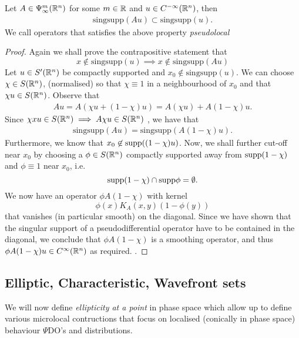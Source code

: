 \documentclass{article}
\begin{document}
\begin{fprop}
    Let $A \in \Psi^m_\infty({\mathbb R}^n)$ for some $m \in {\ensuremath {\mathbb R}}$ and $u \in C^{-\infty}({\mathbb R}^n)$, then 
    \begin{align*}
    \mathrm{sing supp}(A u) \subset \mathrm{sing supp }(u). 
    \end{align*}
    We call operators that satisfies the above property \textit{pseudolocal}
\end{fprop}
\begin{proof}
     Again we shall prove the contrapositive statement that 
    \[
    x \not \in \mathrm{sing supp}(u) \implies x \not \in \mathrm{sing supp}(Au)
    \]
    Let $u \in S'({\mathbb R}^n)$ be compactly supported and $x_0 \not \in \mathrm{sing supp}(u)$.  We can choose $\chi \in S({\mathbb R}^n)$, (normalised) so that $\chi \equiv 1$ in a neighbourhood of $x_0$ and that $\chi u \in S({\mathbb R}^n)$. Observe that 
    \begin{align*}
    Au = A(\chi u + (1 - \chi)u) = A(\chi u) + A(1 - \chi)u. 
    \end{align*}
    Since $\chi xu \in S({\mathbb R}^n) \implies A\chi u \in S({\mathbb R}^n)$ \cite{rbm lemma 2.3}, we have that 
    \begin{align*}
    \mathrm{singsupp}(Au) = \mathrm{singsupp}(A(1 - \chi)u). 
    \end{align*}
    Furthermore, we know that $x_0 \not \in \mathrm{supp}((1 - \chi)u)$. 
    Now, we shall further cut-off near $x_0$ by choosing a $\phi \in S({\mathbb R}^n)$ compactly supported  away from $\mathrm{supp}(1 - \chi)$ and $\phi \equiv 1$ near $x_0$, i.e. 
    \[
    \mathrm{supp}(1 - \chi) \cap \mathrm{supp} \phi = \emptyset. 
    \]
    We now have an operator $\phi A(1 - \chi) $ with kernel
    \[
    \phi(x) K_A(x, y) ( 1 - \phi(y))
    \]
    that vanishes (in particular smooth) on the diagonal. Since we have shown that the singular support of a pseudodifferential operator have to be contained in the diagonal, we conclude that $\phi A(1 - \chi)$ is a smoothing operator, and thus $\phi A (1 - \chi) u \in C^\infty({\mathbb R}^n)$ as required. .  
\end{proof}


\subsection{Elliptic, Characteristic, Wavefront sets}
We will now define \textit{ellipticity at a point} in phase space which allow up to define various microlocal contructions that focus on  localised (conically in phase space) behaviour $\Psi$DO's and distributions. 
\end{document}
